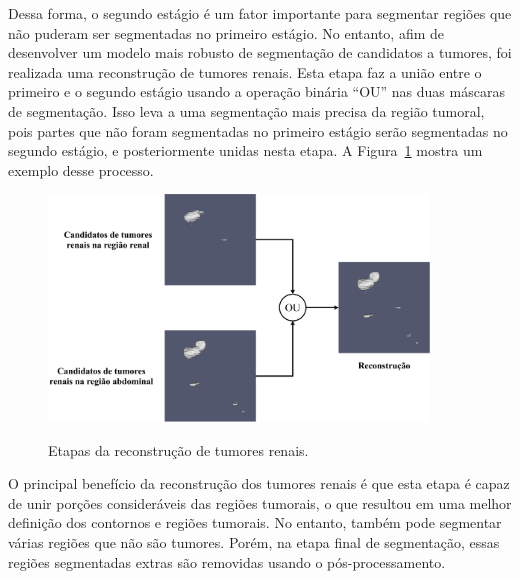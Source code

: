 
Dessa forma, o segundo estágio é um fator importante para segmentar regiões que não puderam ser segmentadas no primeiro estágio. No entanto, afim de desenvolver um modelo mais robusto de segmentação de candidatos a tumores, foi realizada uma reconstrução de tumores renais. Esta etapa faz a união entre o primeiro e o segundo estágio usando a operação binária “OU” nas duas máscaras de segmentação. Isso leva a uma segmentação mais precisa da região tumoral, pois partes que não foram segmentadas no primeiro estágio serão segmentadas no segundo estágio, e posteriormente unidas nesta etapa. A Figura~\ref{fig:reconstrucao} mostra um exemplo desse processo.

\begin{figure}[!ht]
    \centering
    \caption{Etapas da reconstrução de tumores renais.}
    \includegraphics[width=0.9\textwidth]{figuras/reconstrucao.pdf}
    \label{fig:reconstrucao}
\end{figure}


O principal benefício da reconstrução dos tumores renais é que esta etapa é capaz de unir porções consideráveis das regiões tumorais, o que resultou em uma melhor definição dos contornos e regiões tumorais. No entanto, também pode segmentar várias regiões que não são tumores. Porém, na etapa final de segmentação, essas regiões segmentadas extras são removidas usando o pós-processamento.

